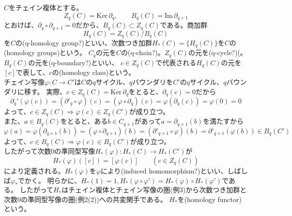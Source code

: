 \documentclass[dvipdfmx,a4paper,11pt]{jsarticle}
\begin{document}
\begin{tcolorbox}[title = 例5]
  $C$をチェイン複体とする。
  \begin{equation*}
    Z_{q}(C)=\text{Ker}\, \partial_{q},\qquad B_{q}(C)=\text{Im}\, \partial_{q+1}
  \end{equation*}
  とおけば、$\partial_{q}\circ \partial_{q+1} = 0$だから、$B_{q}(C)\subset Z_{q}(C)$である。商加群
  \begin{equation*}
    H_{q}(C)=Z_{q}(C)/B_{q}(C)
  \end{equation*}
  を$C$の(q-homology group?)といい、次数つき加群$H_{*}(C)=\{H_{q}(C)\}$を$C$の(homology groups)という。
  $C_q$の元を$C$の(q-chain?)。$Z_{q}(C)$の元を(q-cycle?)(。$B_{q}(C)$の元を(q-boundary?)といい、
  $c\in Z_{q}(C)$で代表される$H_{q}(C)$の元を$[c]$で表して、$c$の(homology class)という。\\
  チェイン写像$\varphi : C\to C'$は$C$の$q$サイクル、$q$バウンダリを$C'$の$q$サイクル、$q$バウンダリに移す。
  実際、$c\in Z_{q}(C)=\text{Ker}\, \partial_{q}$をとると、$\partial_{q}(c)=0$だから
  \begin{equation*}
    \partial_{q}'(\varphi(c))=(\partial'_{q} \circ \varphi)(c)=(\varphi \circ \partial_{q})(c)=\varphi(\partial_{q}(c))=\varphi(0)=0
  \end{equation*}
  よって、$c\in Z_{q}(C)\Rightarrow \varphi(c)\in Z_{q}(C')$が成り立つ。\\
  また、$a\in B_{q}(C)$をとると、ある$b\in C_{q+1}$があって$a=\partial_{q+1}(b)$を満たすから
  \begin{equation*}
    \varphi(a)=\varphi(\partial_{q+1}(b))=(\varphi \circ \partial_{q+1})(b)=(\partial'_{q+1} \circ \varphi)(b)=\partial'_{q+1}(\varphi(b))\in B_{q}(C')
  \end{equation*}
  よって、$c\in B_{q}(C)\Rightarrow \varphi(c)\in B_{q}(C')$が成り立つ。\\
  したがって次数$0$の準同型写像$H_{*}(\varphi) : H_{*}(C)\to H_{*}(C')$が
  \begin{equation*}
    H_{*}(\varphi)([c])=[\varphi(c)]\qquad (c\in Z_{q}(C))
  \end{equation*}
  により定義される。$H_{*}(\varphi)$を$\varphi$により(induced homomorphism?)といい、しばしば$\varphi_{*}$でかく。
  明らかに、$H_{*}(1)=1,H_{*}(\varphi \circ \varphi')=H_{*}(\varphi)\circ H_{*}(\varphi')$である。
  したがって$H_{*}$はチェイン複体とチェイン写像の圏(例3)から次数つき加群と次数$0$の準同型写像の圏(例2(2))への共変関手である。
  $H_{*}$を(homology functor)という。
\end{tcolorbox}
\end{document}
